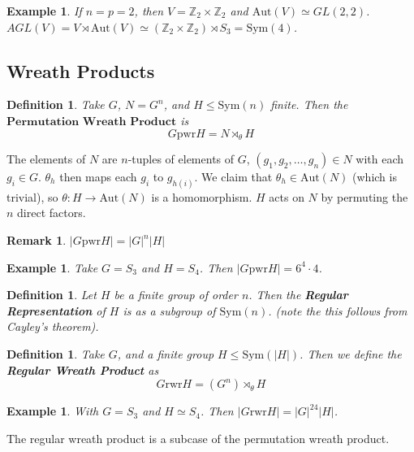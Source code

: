 \documentclass[a4paper,10pt]{article}
\newcommand{\ZZ}{\mathbb{Z}}
\newtheorem{Def}[thm]{Definition}
\newtheorem{eg}[thm]{Example}
\newtheorem{rem}[thm]{Remark}
\begin{document}
\begin{eg}
If $n = p = 2$, then $V = \ZZ_2 \times \ZZ_2$ and $\text{Aut}(V) \simeq GL(2,2)$. $AGL(V) = V \rtimes \text{Aut}(V) \simeq (\ZZ_2 \times \ZZ_2) \rtimes S_3 = \text{Sym}(4)$. 
\end{eg}

\subsection{Wreath Products}

\begin{Def}
Take $G$, $N = G^n$, and $H \leq \text{Sym}(n)$ finite. Then the $\textbf{Permutation Wreath Product}$ is
\[ G \text{pwr} H = N \rtimes_\theta H \]
\end{Def}

The elements of $N$ are $n$-tuples of elements of $G$, $(g_1, g_2, \dots, g_n) \in N$ with each $g_i \in G$. $\theta_h$ then maps each $g_i$ to $g_{h(i)}$. We claim that $\theta_h \in \text{Aut}(N)$ (which is trivial), so $\theta : H \rightarrow \text{Aut}(N)$ is a homomorphism. $H$ acts on $N$ by permuting the $n$ direct factors. 
\begin{rem}
$|G \text{pwr} H| = |G|^n |H|$
\end{rem}


\begin{eg}
Take $G = S_3$ and $H = S_4$. Then $|G \text{pwr} H| = 6^4 \cdot 4$. 
\end{eg}


\begin{Def}
Let $H$ be a finite group of order $n$. Then the \textbf{Regular Representation} of $H$ is as a subgroup of $\text{Sym}(n)$. (note the this follows from Cayley's theorem).
\end{Def}


\begin{Def}
Take $G$, and a finite group $H \leq \text{Sym}(|H|)$. Then we define the \textbf{Regular Wreath Product} as
\[ G \text{rwr} H = ( G^n) \rtimes_\theta H \]
\end{Def}

\begin{eg}
With $G = S_3$ and $H \simeq S_4$. Then $|G \text{rwr} H | = |G|^{24} |H|$. 
\end{eg}


The regular wreath product is a subcase of the permutation wreath product. 
\end{document}
